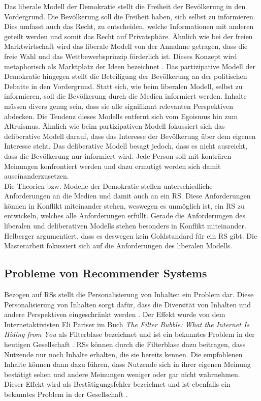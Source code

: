 Das liberale Modell der Demokratie stellt die Freiheit der Bevölkerung in den Vordergrund.
Die Bevölkerung soll die Freiheit haben, sich selbst zu informieren.
Dies umfasst auch das Recht, zu entscheiden, welche Informationen mit anderen geteilt werden und somit das Recht auf Privatsphäre.
Ähnlich wie bei der freien Marktwirtschaft wird das liberale Modell von der Annahme getragen, dass die freie Wahl und das Wettbewerbsprinzip förderlich ist.
Dieses Konzept wird metaphorisch als \glqq Marktplatz der Ideen\grqq{} bezeichnet \cite{marketplace-ideas}.
Das partizipative Modell der Demokratie hingegen stellt die Beteiligung der Bevölkerung an der politischen Debatte in den Vordergrund.
Statt sich, wie beim liberalen Modell, selbst zu informieren, soll die Bevölkerung durch die Medien informiert werden.
Inhalte müssen divers genug sein, dass sie alle signifikant relevanten Perspektiven abdecken.
Die Tendenz dieses Modells entfernt sich vom Egoismus hin zum Altruismus.
Ähnlich wie beim partizipativen Modell fokussiert sich das deliberative Modell darauf, dass das Interesse der Bevölkerung über dem eigenen Interesse steht.
Das deliberative Modell besagt jedoch, dass es nicht ausreicht, dass die Bevölkerung nur informiert wird.
Jede Person soll mit konträren Meinungen konfrontiert werden und dazu ermutigt werden sich damit auseinanderzusetzen. \\

Die Theorien bzw. Modelle der Demokratie stellen unterschiedliche Anforderungen an die Medien und damit auch an ein \ac{RS}.
Diese Anforderungen können in Konflikt miteinander stehen, weswegen es unmöglich ist, ein \ac{RS} zu entwickeln, welches alle Anforderungen erfüllt.
Gerade die Anforderungen des liberalen und deliberativen Modells stehen besonders in Konflikt miteinander.
Helberger argumentiert, dass es deswegen kein Goldstandard für ein \ac{RS} gibt.
Die Masterarbeit fokussiert sich auf die Anforderungen des liberalen Modells. %

\subsection{Probleme von Recommender Systems}
Bezogen auf \acp{RS} stellt die Personalisierung von Inhalten ein Problem dar.
Diese Personalisierung von Inhalten sorgt dafür, dass die Diversität von Inhalten und andere Perspektiven eingeschränkt werden \cite{rundfunk}.
Der Effekt wurde von dem Internetaktivisten Eli Pariser im Buch \textit{The Filter Bubble: What the Internet Is Hiding from You} als Filterblase bezeichnet und ist ein bekanntes Problem in der heutigen Gesellschaft \cite{filter-bubble}.
\acp{RS} können durch die Filterblase dazu beitragen, dass Nutzende nur noch Inhalte erhalten, die sie bereits kennen.
Die empfohlenen Inhalte können dann dazu führen, dass Nutzende sich in ihrer eigenen Meinung bestätigt sehen und andere Meinungen weniger oder gar nicht wahrnehmen.
Dieser Effekt wird als Bestätigungsfehler bezeichnet und ist ebenfalls ein bekanntes Problem in der Gesellschaft \cite{reasoning-rule}. \\

